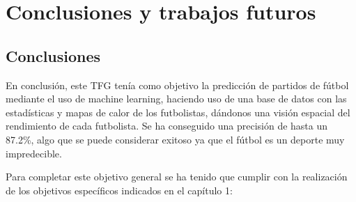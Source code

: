 \chapter{Conclusiones y trabajos futuros}

\section{Conclusiones}

En conclusión, este TFG tenía como objetivo la predicción de partidos de fútbol mediante el uso de machine learning, haciendo uso de una base de datos con las estadísticas y mapas de calor de los futbolistas, dándonos una visión espacial del rendimiento de cada futbolista. Se ha conseguido una precisión de hasta un 87.2\%, algo que se puede considerar exitoso ya que el fútbol es un deporte muy impredecible.

Para completar este objetivo general se ha tenido que cumplir con la realización de los objetivos específicos indicados en el capítulo 1:

